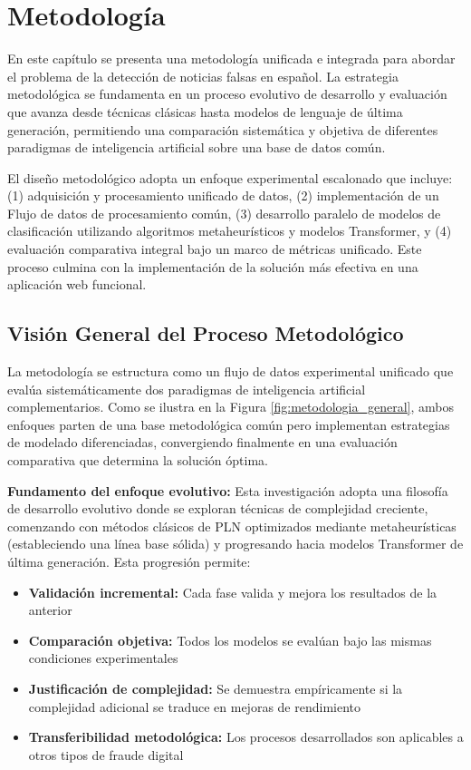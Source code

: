 \chapter{Metodología \label{cap:Metodologia}}

En este capítulo se presenta una metodología unificada e integrada para abordar el problema de la detección de noticias falsas en español. La estrategia metodológica se fundamenta en un proceso evolutivo de desarrollo y evaluación que avanza desde técnicas clásicas hasta modelos de lenguaje de última generación, permitiendo una comparación sistemática y objetiva de diferentes paradigmas de inteligencia artificial sobre una base de datos común.

El diseño metodológico adopta un enfoque experimental escalonado que incluye: (1) adquisición y procesamiento unificado de datos, (2) implementación de un Flujo de datos de procesamiento común, (3) desarrollo paralelo de modelos de clasificación utilizando algoritmos metaheurísticos y modelos Transformer, y (4) evaluación comparativa integral bajo un marco de métricas unificado. Este proceso culmina con la implementación de la solución más efectiva en una aplicación web funcional.

\section{Visión General del Proceso Metodológico}

La metodología se estructura como un flujo de datos experimental unificado que evalúa sistemáticamente dos paradigmas de inteligencia artificial complementarios. Como se ilustra en la Figura \ref{fig:metodologia_general}, ambos enfoques parten de una base metodológica común pero implementan estrategias de modelado diferenciadas, convergiendo finalmente en una evaluación comparativa que determina la solución óptima.

\textbf{Fundamento del enfoque evolutivo:} Esta investigación adopta una filosofía de desarrollo evolutivo donde se exploran técnicas de complejidad creciente, comenzando con métodos clásicos de PLN optimizados mediante metaheurísticas (estableciendo una línea base sólida) y progresando hacia modelos Transformer de última generación. Esta progresión permite:

\begin{itemize}
    \item \textbf{Validación incremental:} Cada fase valida y mejora los resultados de la anterior
    \item \textbf{Comparación objetiva:} Todos los modelos se evalúan bajo las mismas condiciones experimentales
    \item \textbf{Justificación de complejidad:} Se demuestra empíricamente si la complejidad adicional se traduce en mejoras de rendimiento
    \item \textbf{Transferibilidad metodológica:} Los procesos desarrollados son aplicables a otros tipos de fraude digital
\end{itemize}

